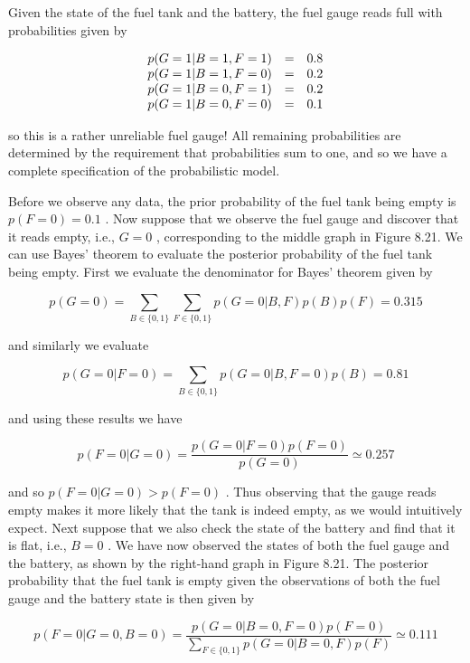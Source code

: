 \documentclass[
  10
]{article}
\begin{document}
Given the state of the fuel tank and the battery, the fuel gauge reads
full with probabilities given by

\[
\begin{array}{r c l} p (G = 1 | B = 1, F = 1) & = & 0. 8 \\ p (G = 1 | B = 1, F = 0) & = & 0. 2 \\ p (G = 1 | B = 0, F = 1) & = & 0. 2 \\ p (G = 1 | B = 0, F = 0) & = & 0. 1 \end{array}
\]

so this is a rather unreliable fuel gauge! All remaining probabilities
are determined by the requirement that probabilities sum to one, and so
we have a complete specification of the probabilistic model.

Before we observe any data, the prior probability of the fuel tank being
empty is \(p ( F = 0 ) = 0 . 1\) . Now suppose that we observe the fuel
gauge and discover that it reads empty, i.e., \(G = 0\) , corresponding
to the middle graph in Figure 8.21. We can use Bayes' theorem to
evaluate the posterior probability of the fuel tank being empty. First
we evaluate the denominator for Bayes' theorem given by

\[
p (G = 0) = \sum_ {B \in \{0, 1 \}} \sum_ {F \in \{0, 1 \}} p (G = 0 | B, F) p (B) p (F) = 0. 3 1 5\tag{8.30}
\]

and similarly we evaluate

\[
p (G = 0 | F = 0) = \sum_ {B \in \{0, 1 \}} p (G = 0 | B, F = 0) p (B) = 0. 8 1\tag{8.31}
\]

and using these results we have

\[
p (F = 0 | G = 0) = \frac {p (G = 0 | F = 0) p (F = 0)}{p (G = 0)} \simeq 0. 2 5 7\tag{8.32}
\]

and so \(p ( F = 0 | G = 0 ) > p ( F = 0 )\) . Thus observing that the
gauge reads empty makes it more likely that the tank is indeed empty, as
we would intuitively expect. Next suppose that we also check the state
of the battery and find that it is flat, i.e., \(B = 0\) . We have now
observed the states of both the fuel gauge and the battery, as shown by
the right-hand graph in Figure 8.21. The posterior probability that the
fuel tank is empty given the observations of both the fuel gauge and the
battery state is then given by

\[
p (F = 0 | G = 0, B = 0) = \frac {p (G = 0 | B = 0 , F = 0) p (F = 0)}{\sum_ {F \in \{0 , 1 \}} p (G = 0 | B = 0 , F) p (F)} \simeq 0. 1 1 1\tag{8.33}
\]
\end{document}
